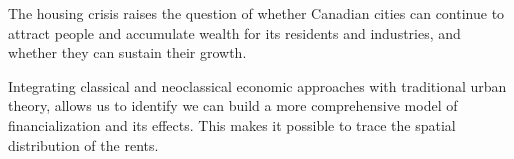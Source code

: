 





The housing crisis raises the question of whether Canadian cities can continue to attract people and accumulate wealth for its residents and industries, and whether they can sustain their growth.

Integrating classical and neoclassical economic approaches with traditional urban theory,  allows us to identify 
 we can build a more comprehensive model of financialization and its effects. This makes it possible to trace the spatial distribution of the rents.

